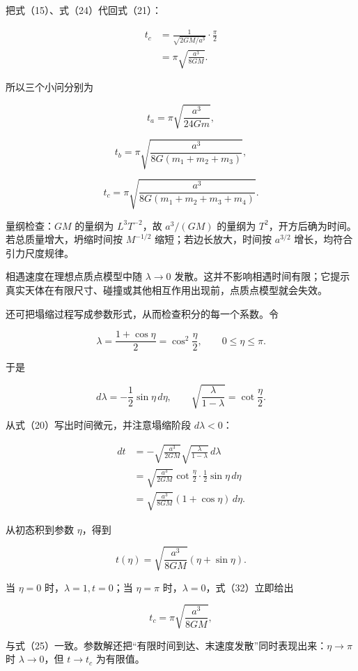 \documentclass[12pt,a4paper,UTF8]{ctexart}
\begin{document}
把式（15）、式（24）代回式（21）：

\[
\begin{aligned}
t_c
&=\frac1{\sqrt{2GM/a^3}}\cdot\frac\pi2\\
&=\pi\sqrt{\frac{a^3}{8GM}}.
\end{aligned} \tag{25}
\]

所以三个小问分别为

\[
\boxed{
t_a=\pi\sqrt{\frac{a^3}{24Gm}}
}, \tag{26}
\]

\[
\boxed{
t_b=\pi\sqrt{\frac{a^3}{8G(m_1+m_2+m_3)}}
}, \tag{27}
\]

\[
\boxed{
t_c=\pi\sqrt{\frac{a^3}{8G(m_1+m_2+m_3+m_4)}}
}. \tag{28}
\]

量纲检查：\(G M\) 的量纲为 \(L^3T^{-2}\)，故 \(a^3/(GM)\) 的量纲为
\(T^2\)，开方后确为时间。若总质量增大，坍缩时间按 \(M^{-1/2}\)
缩短；若边长放大，时间按 \(a^{3/2}\) 增长，均符合引力尺度规律。

相遇速度在理想点质点模型中随 \(\lambda\to0\)
发散。这并不影响相遇时间有限；它提示真实天体在有限尺寸、碰撞或其他相互作用出现前，点质点模型就会失效。

还可把塌缩过程写成参数形式，从而检查积分的每一个系数。令

\[
\lambda=\frac{1+\cos\eta}{2}
=\cos^2\frac\eta2,
\qquad 0\leqslant\eta\leqslant\pi. \tag{29}
\]

于是

\[
d\lambda=-\frac12\sin\eta\,d\eta,
\qquad
\sqrt{\frac{\lambda}{1-\lambda}}=\cot\frac\eta2. \tag{30}
\]

从式（20）写出时间微元，并注意塌缩阶段 \(d\lambda<0\)：

\[
\begin{aligned}
dt
&=-\sqrt{\frac{a^3}{2GM}}
\sqrt{\frac{\lambda}{1-\lambda}}\,d\lambda\\
&=\sqrt{\frac{a^3}{2GM}}
\cot\frac\eta2\cdot\frac12\sin\eta\,d\eta\\
&=\sqrt{\frac{a^3}{8GM}}(1+\cos\eta)\,d\eta.
\end{aligned} \tag{31}
\]

从初态积到参数 \(\eta\)，得到

\[
t(\eta)=\sqrt{\frac{a^3}{8GM}}
(\eta+\sin\eta). \tag{32}
\]

当 \(\eta=0\) 时，\(\lambda=1,t=0\)；当 \(\eta=\pi\)
时，\(\lambda=0\)，式（32）立即给出

\[
t_c=\pi\sqrt{\frac{a^3}{8GM}},
\]

与式（25）一致。参数解还把``有限时间到达、末速度发散''同时表现出来：\(\eta\to\pi\)
时 \(\lambda\to0\)，但 \(t\to t_c\) 为有限值。
\end{document}
